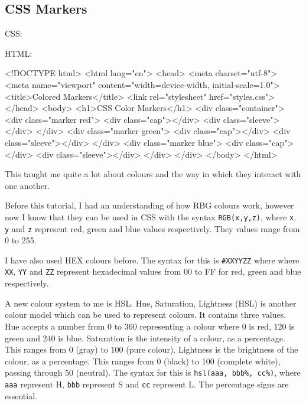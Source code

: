 \subsection{CSS Markers}
CSS:
HTML:
\begin{html}
<!DOCTYPE html>
<html lang="en">
  <head>
    <meta charset="utf-8">
    <meta name="viewport" content="width=device-width, initial-scale=1.0">
    <title>Colored Markers</title>
    <link rel="stylesheet" href="styles.css">
  </head>
  <body>
    <h1>CSS Color Markers</h1>
    <div class="container">
      <div class="marker red">
        <div class="cap"></div>
        <div class="sleeve"></div>
      </div>
      <div class="marker green">
        <div class="cap"></div>
        <div class="sleeve"></div>
      </div>
      <div class="marker blue">
        <div class="cap"></div>
        <div class="sleeve"></div>
      </div>
    </div>
  </body>
</html>
\end{html}
This taught me quite a lot about colours and the way in which they interact with one another. 

Before this tutorial, I had an understanding of how RBG colours work, however now I know that they can be used in CSS with the syntax \texttt{RGB(x,y,z)}, where \texttt{x}, \texttt{y} and \texttt{z} represent red, green and blue values respectively. They values range from 0 to 255.

I have also used HEX colours before. The syntax for this is \texttt{\#XXYYZZ} where where \texttt{XX}, \texttt{YY} and \texttt{ZZ} represent hexadecimal values from 00 to FF for red, green and blue respectively.

A new colour system to me is HSL.  Hue, Saturation, Lightness (HSL) is another colour model which can be used to represent colours. It contains three values. Hue accepts a number from 0 to 360 representing a colour where 0 is red, 120 is green and 240 is blue. Saturation is the intensity of a colour, as a percentage. This ranges from 0 (gray) to 100 (pure colour). Lightness is the brightness of the colour, as a percentage. This ranges from 0 (black) to 100 (complete white), passing through 50 (neutral). The syntax for this is \texttt{hsl(aaa, bbb\%, cc\%)}, where \texttt{aaa} represent H, \texttt{bbb} represent S and \texttt{cc} represent L. The percentage signs are essential.

